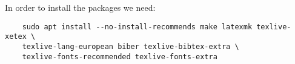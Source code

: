 \documentclass[../wifi-security.tex]{subfiles}
\begin{document}

In order to install the packages we need:


\begin{verbatim}
	sudo apt install --no-install-recommends make latexmk texlive-xetex \
	texlive-lang-european biber texlive-bibtex-extra \
	texlive-fonts-recommended texlive-fonts-extra
\end{verbatim}
\end{document}
